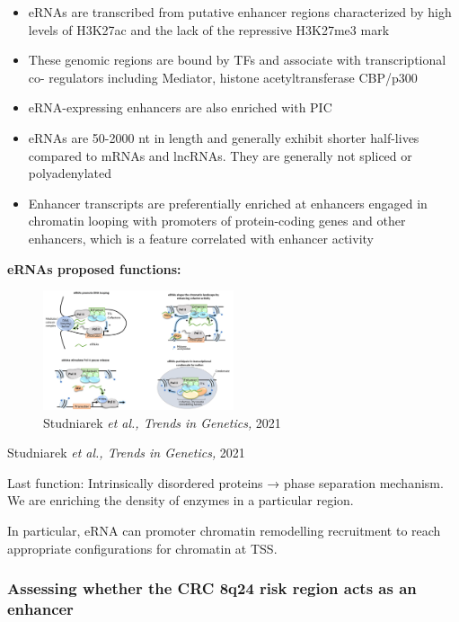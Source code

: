 \begin{itemize}
\tightlist
\item
  eRNAs are transcribed from putative enhancer regions characterized by high levels of H3K27ac and the lack of the repressive H3K27me3 mark
\item
  These genomic regions are bound by TFs and associate with transcriptional co- regulators including Mediator, histone acetyltransferase CBP/p300
\item
  eRNA-expressing enhancers are also enriched with PIC
\item
  eRNAs are 50-2000 nt in length and generally exhibit shorter half-lives compared to
  mRNAs and lncRNAs. They are generally not spliced or polyadenylated
\item
  Enhancer transcripts are preferentially enriched at enhancers engaged in chromatin looping with promoters of protein-coding genes and other enhancers, which is a feature correlated with enhancer activity
\end{itemize}

\textbf{eRNAs proposed functions:}

\begin{figure}
\centering
\includegraphics[width=0.5\textwidth]{../_resources/Screenshot_2022-10-12_at_10-00-02.png}
\caption{Studniarek \emph{et al., Trends in Genetics,} 2021}
\end{figure}

Studniarek \emph{et al., Trends in Genetics,} 2021

Last function: Intrinsically disordered proteins → phase separation mechanism. We are enriching the density of enzymes in a particular region.

In particular, eRNA can promoter chromatin remodelling recruitment to reach appropriate configurations for chromatin at TSS.

\hypertarget{assessing-whether-the-crc-8q24-risk-region-acts-as-an-enhancer}{%
\subsubsection{\texorpdfstring{\textbf{Assessing whether the CRC 8q24 risk region acts as an enhancer}}{Assessing whether the CRC 8q24 risk region acts as an enhancer}}\label{assessing-whether-the-crc-8q24-risk-region-acts-as-an-enhancer}}

